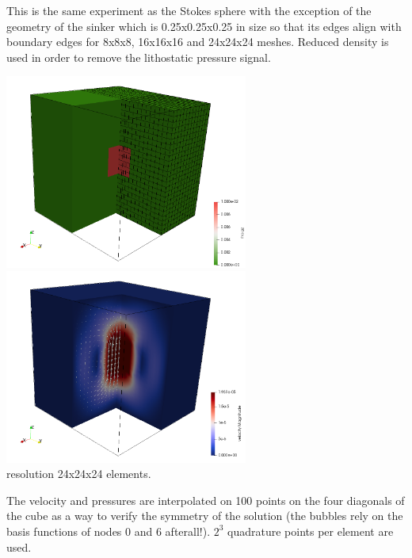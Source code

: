 This is the same experiment as the Stokes sphere with the exception of the geometry of the sinker which 
is 0.25x0.25x0.25 in size so that its edges align with boundary edges for 8x8x8, 16x16x16 and 24x24x24 meshes.
Reduced density is used in order to remove the lithostatic pressure signal.
 
\begin{center}
\includegraphics[width=8cm]{python_codes/fieldstone_82/results/bench4/rho}
\includegraphics[width=8cm]{python_codes/fieldstone_82/results/bench4/vel}\\
{\captionfont resolution 24x24x24 elements.}
\end{center}

The velocity and pressures are interpolated on 100 points on the four diagonals of the cube
as a way to verify the symmetry of the solution (the bubbles rely on the basis 
functions of nodes 0 and 6 afterall!). $2^3$ quadrature points per element are used. 

